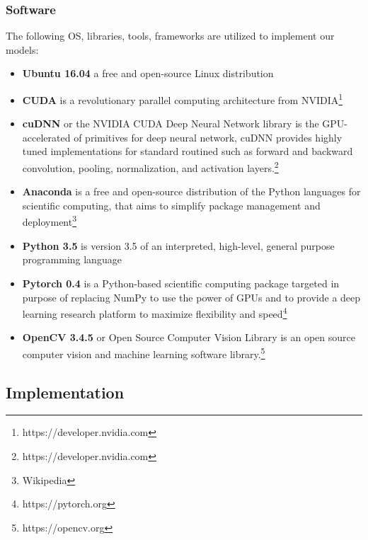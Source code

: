 \subsubsection{Software}
\hspace{0.45cm}The following OS, libraries, tools, frameworks are utilized to implement our models:
\begin{itemize}
    \item \textbf{Ubuntu 16.04} a free and open-source Linux distribution
    \item \textbf{CUDA} is a revolutionary parallel computing architecture from NVIDIA\footnote{https://developer.nvidia.com}
    \item \textbf{cuDNN} or the NVIDIA CUDA Deep Neural Network library is the GPU-accelerated of primitives for deep neural network, 
    cuDNN provides highly tuned implementations for standard routined such as forward and backward convolution, pooling, normalization, 
    and activation layers.\footnote{https://developer.nvidia.com}
    \item \textbf{Anaconda} is a free and open-source distribution of the Python languages for scientific computing, that aims to simplify package management and deployment\footnote{Wikipedia}
    \item \textbf{Python 3.5} is version 3.5 of an interpreted, high-level, general purpose programming language
    \item \textbf{Pytorch 0.4} is a Python-based scientific computing package targeted in purpose of replacing NumPy to use the power of GPUs and to provide a deep learning research platform to maximize flexibility and speed\footnote{https://pytorch.org}
    \item \textbf{OpenCV 3.4.5} or Open Source Computer Vision Library is an open source computer vision and machine learning software library.\footnote{https://opencv.org}
\end{itemize}

\subsection{Implementation}

